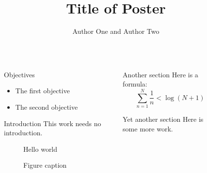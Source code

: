 \documentclass[final]{beamer}
\title{Title of Poster}
\author{Author One and Author Two} %
\institute{Princeton University, Mechanical and Aerospace Engineering} %
\newlength{\sepwid}
\newlength{\onecolwid}
\begin{document}
\begin{frame}[t] %
\begin{columns}[t]
\begin{column}{\sepwid}\end{column} %

\begin{column}{\onecolwid}

\begin{alertblock}{Objectives}
\begin{itemize}
\item The first objective
\item The second objective
\end{itemize}
\end{alertblock}

\begin{block}{Introduction}
  This work needs no introduction.  
\end{block}

\begin{figure}
  \centering
  Hello world
\caption{Figure caption}
\end{figure}

\end{column} %
\begin{column}{\sepwid}\end{column} %

\begin{column}{\onecolwid}

\begin{block}{Another section}
  Here is a formula:
  \begin{equation*}
    \sum_{n=1}^N \frac{1}{n} < \log (N+1)
  \end{equation*}
\end{block}

\begin{block}{Yet another section}
Here is some more work.
\end{block}

\end{column} %
\begin{column}{\sepwid}\end{column} %

\begin{column}{\onecolwid}


\end{column}
\end{columns}
\end{frame}
\end{document}
